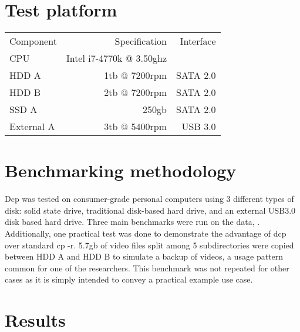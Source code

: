 \documentclass[12pt]{article}
\begin{document}
\section {Test platform}
\begin{tabular}{l|r r}
  Component & Specification                   & Interface \\
  CPU       & Intel i7-4770k @ 3.50ghz                    \\
  HDD A     &         1tb @ 7200rpm           & SATA 2.0  \\
  HDD B     &                 2tb @ 7200rpm   & SATA 2.0  \\
  SSD A     &         250gb                   & SATA 2.0  \\
  External A& 3tb @ 5400rpm                   & USB 3.0   \\
\end{tabular}
\section{Benchmarking methodology}
Dcp was tested on consumer-grade personal computers using 3 different types
of disk: solid state drive, traditional disk-based hard drive, and
an external USB3.0 disk based hard drive.
Three main benchmarks were run on the data, %
.
Additionally, one practical test was done to demonstrate the advantage
of dcp over standard cp -r. 5.7gb of video files split among 5 subdirectories were copied between
HDD A and HDD B to simulate a backup of videos, a usage pattern common for one of the researchers.
This benchmark was not repeated for other cases as it is simply intended to convey a practical example use
case. %

\section{Results}
\end{document}
